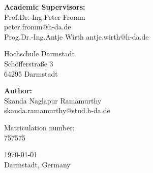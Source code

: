 \begin{titlepage}
\begin{center}
\begin{minipage}{0.5\textwidth}
\begin{flushleft}
\textbf{Academic Supervisors:}\\[0.1cm]
Prof.Dr.-Ing.Peter Fromm\\
peter.fromm@h-da.de\\[0.2cm]
Prog.Dr.-Ing.Antje Wirth
antje.wirth@h-da.de\\[0.2cm]
\end{flushleft}
\end{minipage}
\begin{minipage}{0.49\textwidth}
\begin{flushright} 
Hochschule Darmstadt \\
Schöfferstraße 3 \\
64295 Darmstadt\\
\end{flushright}
\end{minipage}
\vspace{1cm}


\begin{minipage}{0.5\textwidth}
\begin{flushleft}
\textbf{Author:}\\[0.1cm]
Skanda Naglapur Ramamurthy\\
skanda.ramamurthy@stud.h-da.de\\[0.2cm]
\end{flushleft}
\end{minipage}
\begin{minipage}{0.49\textwidth}
\begin{flushright} 
Matriculation number: \\
757575 \\
\end{flushright}
\end{minipage}
\end{center}
\vspace{1cm}

{\raggedleft \today}\\
{\raggedleft Darmstadt, Germany}

\end{titlepage}

